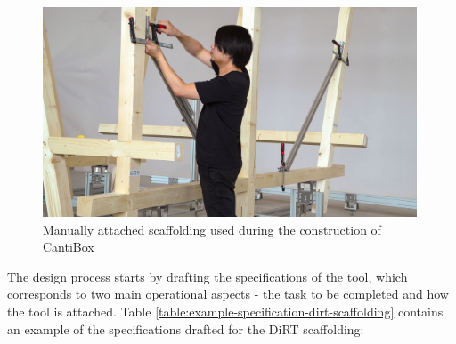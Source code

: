 \begin{figure}[h!]
    \centering
    \includegraphics[trim=0mm 20mm 0mm 0mm, clip, width=0.99\textwidth]{images/10/Manual Attach Scaffolding.jpg}
    \caption{Manually attached scaffolding used during the construction of CantiBox}
    \label{fig:manual-scaffolding-cantibox}
\end{figure}

The design process starts by drafting the specifications of the tool, which corresponds to two main operational aspects - the task to be completed and how the tool is attached. Table \ref{table:example-specification-dirt-scaffolding} contains an example of the specifications drafted for the DiRT scaffolding:

